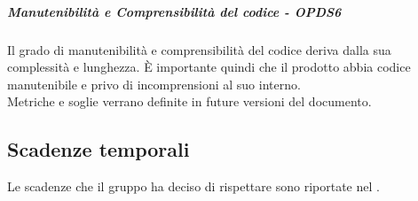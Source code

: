 \documentclass[PianoDiQualifica.tex]{subfiles}
\begin{document}
				\subparagraph{Manutenibilità e Comprensibilità del codice - OPDS6}
				Il grado di manutenibilità e comprensibilità del codice deriva dalla sua complessità e lunghezza. È importante quindi che il prodotto abbia codice manutenibile e
				privo di incomprensioni al suo interno. \\
				Metriche e soglie verrano definite in future versioni del documento.
				
		\subsection{Scadenze temporali}
		Le scadenze che il gruppo \GRUPPO{} ha deciso di rispettare sono riportate nel \PPdocRR{}.
				
\end{document}
